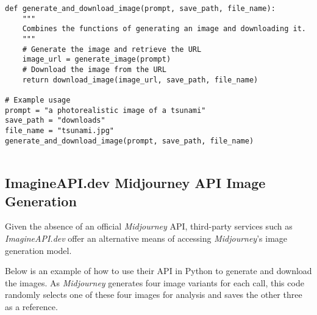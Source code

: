 \begin{lstlisting}
def generate_and_download_image(prompt, save_path, file_name):
    """
    Combines the functions of generating an image and downloading it.
    """
    # Generate the image and retrieve the URL
    image_url = generate_image(prompt)
    # Download the image from the URL
    return download_image(image_url, save_path, file_name)

# Example usage
prompt = "a photorealistic image of a tsunami"
save_path = "downloads"
file_name = "tsunami.jpg"
generate_and_download_image(prompt, save_path, file_name)


\end{lstlisting}

\subsection{ImagineAPI.dev Midjourney API Image Generation}

Given the absence of an official \textit{Midjourney} API, third-party services such as \textit{ImagineAPI.dev} offer an alternative means of accessing \textit{Midjourney}'s image generation model. 

Below is an example of how to use their API in Python to generate and download the images. As \textit{Midjourney} generates four image variants for each call, this code randomly selects one of these four images for analysis and saves the other three as a reference.

